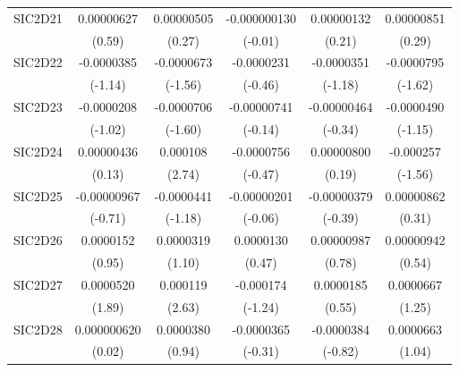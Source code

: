 \begin{table}[htbp]
\begin{tabular}{l*{5}{c}}
SIC2D21     &  0.00000627         &  0.00000505         &-0.000000130         &  0.00000132         &  0.00000851         \\
            &      (0.59)         &      (0.27)         &     (-0.01)         &      (0.21)         &      (0.29)         \\
SIC2D22     &  -0.0000385         &  -0.0000673         &  -0.0000231         &  -0.0000351         &  -0.0000795         \\
            &     (-1.14)         &     (-1.56)         &     (-0.46)         &     (-1.18)         &     (-1.62)         \\
SIC2D23     &  -0.0000208         &  -0.0000706         & -0.00000741         & -0.00000464         &  -0.0000490         \\
            &     (-1.02)         &     (-1.60)         &     (-0.14)         &     (-0.34)         &     (-1.15)         \\
SIC2D24     &  0.00000436         &    0.000108\sym{**} &  -0.0000756         &  0.00000800         &   -0.000257         \\
            &      (0.13)         &      (2.74)         &     (-0.47)         &      (0.19)         &     (-1.56)         \\
SIC2D25     & -0.00000967         &  -0.0000441         & -0.00000201         & -0.00000379         &  0.00000862         \\
            &     (-0.71)         &     (-1.18)         &     (-0.06)         &     (-0.39)         &      (0.31)         \\
SIC2D26     &   0.0000152         &   0.0000319         &   0.0000130         &  0.00000987         &  0.00000942         \\
            &      (0.95)         &      (1.10)         &      (0.47)         &      (0.78)         &      (0.54)         \\
SIC2D27     &   0.0000520         &    0.000119\sym{**} &   -0.000174         &   0.0000185         &   0.0000667         \\
            &      (1.89)         &      (2.63)         &     (-1.24)         &      (0.55)         &      (1.25)         \\
SIC2D28     & 0.000000620         &   0.0000380         &  -0.0000365         &  -0.0000384         &   0.0000663         \\
            &      (0.02)         &      (0.94)         &     (-0.31)         &     (-0.82)         &      (1.04)         \\

\end{tabular}
\end{table}
